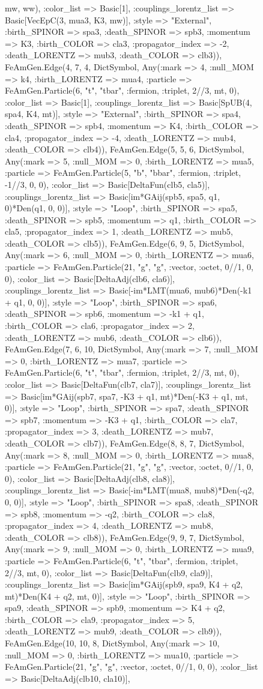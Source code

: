 \documentclass{revtex4}
\begin{document}
\begin{figure}[!htb]
\begin{center}
{mw, ww), :color_list => Basic[1], :couplings_lorentz_list => Basic[VecEpC(3, mua3, K3, mw)], :style => "External", :birth_SPINOR => spa3, :death_SPINOR => spb3, :momentum => K3, :birth_COLOR => cla3, :propagator_index => -2, :death_LORENTZ => mub3, :death_COLOR => clb3)), FeAmGen.Edge(4, 7, 4, Dict{Symbol, Any}(:mark => 4, :null_MOM => k4, :birth_LORENTZ => mua4, :particle => FeAmGen.Particle(6, "t", "tbar", :fermion, :triplet, 2//3, mt, 0), :color_list => Basic[1], :couplings_lorentz_list => Basic[SpUB(4, spa4, K4, mt)], :style => "External", :birth_SPINOR => spa4, :death_SPINOR => spb4, :momentum => K4, :birth_COLOR => cla4, :propagator_index => -4, :death_LORENTZ => mub4, :death_COLOR => clb4)), FeAmGen.Edge(5, 5, 6, Dict{Symbol, Any}(:mark => 5, :null_MOM => 0, :birth_LORENTZ => mua5, :particle => FeAmGen.Particle(5, "b", "bbar", :fermion, :triplet, -1//3, 0, 0), :color_list => Basic[DeltaFun(clb5, cla5)], :couplings_lorentz_list => Basic[im*GAij(spb5, spa5, q1, 0)*Den(q1, 0, 0)], :style => "Loop", :birth_SPINOR => spa5, :death_SPINOR => spb5, :momentum => q1, :birth_COLOR => cla5, :propagator_index => 1, :death_LORENTZ => mub5, :death_COLOR => clb5)), FeAmGen.Edge(6, 9, 5, Dict{Symbol, Any}(:mark => 6, :null_MOM => 0, :birth_LORENTZ => mua6, :particle => FeAmGen.Particle(21, "g", "g", :vector, :octet, 0//1, 0, 0), :color_list => Basic[DeltaAdj(clb6, cla6)], :couplings_lorentz_list => Basic[-im*LMT(mua6, mub6)*Den(-k1 + q1, 0, 0)], :style => "Loop", :birth_SPINOR => spa6, :death_SPINOR => spb6, :momentum => -k1 + q1, :birth_COLOR => cla6, :propagator_index => 2, :death_LORENTZ => mub6, :death_COLOR => clb6)), FeAmGen.Edge(7, 6, 10, Dict{Symbol, Any}(:mark => 7, :null_MOM => 0, :birth_LORENTZ => mua7, :particle => FeAmGen.Particle(6, "t", "tbar", :fermion, :triplet, 2//3, mt, 0), :color_list => Basic[DeltaFun(clb7, cla7)], :couplings_lorentz_list => Basic[im*GAij(spb7, spa7, -K3 + q1, mt)*Den(-K3 + q1, mt, 0)], :style => "Loop", :birth_SPINOR => spa7, :death_SPINOR => spb7, :momentum => -K3 + q1, :birth_COLOR => cla7, :propagator_index => 3, :death_LORENTZ => mub7, :death_COLOR => clb7)), FeAmGen.Edge(8, 8, 7, Dict{Symbol, Any}(:mark => 8, :null_MOM => 0, :birth_LORENTZ => mua8, :particle => FeAmGen.Particle(21, "g", "g", :vector, :octet, 0//1, 0, 0), :color_list => Basic[DeltaAdj(clb8, cla8)], :couplings_lorentz_list => Basic[-im*LMT(mua8, mub8)*Den(-q2, 0, 0)], :style => "Loop", :birth_SPINOR => spa8, :death_SPINOR => spb8, :momentum => -q2, :birth_COLOR => cla8, :propagator_index => 4, :death_LORENTZ => mub8, :death_COLOR => clb8)), FeAmGen.Edge(9, 9, 7, Dict{Symbol, Any}(:mark => 9, :null_MOM => 0, :birth_LORENTZ => mua9, :particle => FeAmGen.Particle(6, "t", "tbar", :fermion, :triplet, 2//3, mt, 0), :color_list => Basic[DeltaFun(clb9, cla9)], :couplings_lorentz_list => Basic[im*GAij(spb9, spa9, K4 + q2, mt)*Den(K4 + q2, mt, 0)], :style => "Loop", :birth_SPINOR => spa9, :death_SPINOR => spb9, :momentum => K4 + q2, :birth_COLOR => cla9, :propagator_index => 5, :death_LORENTZ => mub9, :death_COLOR => clb9)), FeAmGen.Edge(10, 10, 8, Dict{Symbol, Any}(:mark => 10, :null_MOM => 0, :birth_LORENTZ => mua10, :particle => FeAmGen.Particle(21, "g", "g", :vector, :octet, 0//1, 0, 0), :color_list => Basic[DeltaAdj(clb10, cla10)], }
\end{center}
\end{figure}
\end{document}
